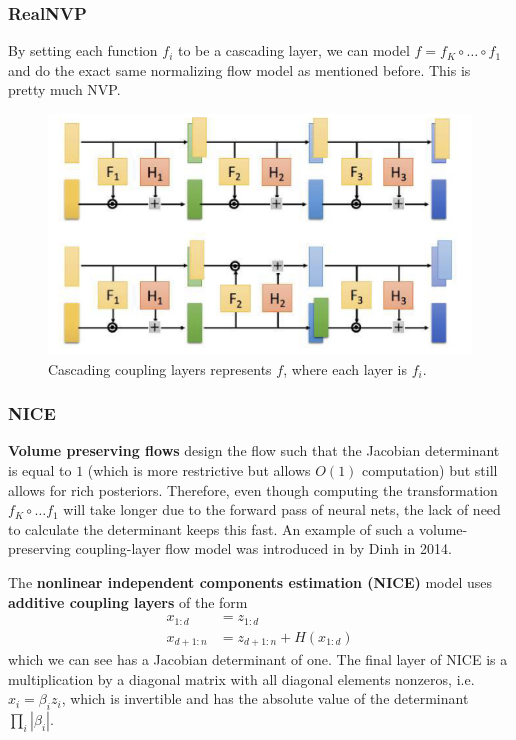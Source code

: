 \documentclass{article}
\begin{document}
  \subsubsection{RealNVP}

    By setting each function $f_i$ to be a cascading layer, we can model $f = f_K \circ \ldots \circ f_1$ and do the exact same normalizing flow model as mentioned before. This is pretty much NVP. 

    \begin{figure}[H]
      \centering 
      \includegraphics[scale=0.4]{img/cascading_layers.png}
      \caption{Cascading coupling layers represents $f$, where each layer is $f_i$.} 
      \label{fig:cascading_layers}
    \end{figure}

  \subsubsection{NICE}

    \textbf{Volume preserving flows} design the flow such that the Jacobian determinant is equal to $1$ (which is more restrictive but allows $O(1)$ computation) but still allows for rich posteriors. Therefore, even though computing the transformation $f_K \circ \ldots f_1$ will take longer due to the forward pass of neural nets, the lack of need to calculate the determinant keeps this fast. An example of such a volume-preserving coupling-layer flow model was introduced in \cite{nice} by Dinh in 2014. 

    \begin{definition}[NICE]
      The \textbf{nonlinear independent components estimation (NICE)} model uses \textbf{additive coupling layers} of the form 
      \begin{align}
        x_{1:d} & = z_{1:d} \\
        x_{d+1:n} & = z_{d+1:n} + H(x_{1:d})
      \end{align}
      which we can see has a Jacobian determinant of one. The final layer of NICE is a multiplication by a diagonal matrix with all diagonal elements nonzeros, i.e. $x_i = \beta_i z_i$, which is invertible and has the absolute value of the determinant $\prod_i |\beta_i|$. 
    \end{definition}
\end{document}
